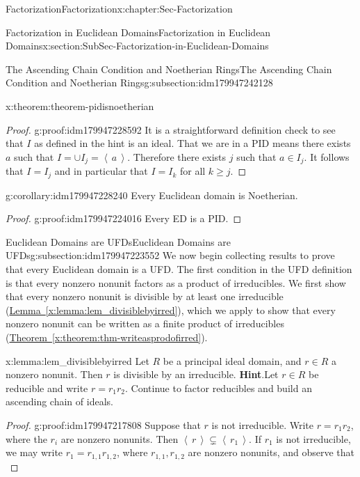 \documentclass[oneside,10pt,]{book}
\newcommand{\blocktitlefont}{\relax}
\newcommand{\xreffont}{\relax}
\numberwithin{equation}{section}
\renewcommand{\geq}{\geqslant}
\newcommand{\ideal}[1]{\left\langle\, #1 \,\right\rangle}
\begin{document}
\begin{chapterptx}{Factorization}{}{Factorization}{}{}{x:chapter:Sec-Factorization}
\begin{sectionptx}{Factorization in Euclidean Domains}{}{Factorization in Euclidean Domains}{}{}{x:section:SubSec-Factorization-in-Euclidean-Domains}
\begin{subsectionptx}{The Ascending Chain Condition and Noetherian Rings}{}{The Ascending Chain Condition and Noetherian Rings}{}{}{g:subsection:idm179947242128}
\begin{theorem}{}{}{x:theorem:theorem-pidisnoetherian}
\end{theorem}
\begin{proof}{}{g:proof:idm179947228592}
It is a straightforward definition check to see that \(I\) as defined in the hint is an ideal. That we are in a PID means there exists \(a\) such that \(I=\cup I_j=\ideal{a}\). Therefore there exists \(j\) such that \(a\in I_j\). It follows that \(I=I_j\) and in particular that \(I=I_k\) for all \(k\geq j\).%
\end{proof}
\begin{corollary}{}{}{g:corollary:idm179947228240}%
Every Euclidean domain is Noetherian.%
\end{corollary}
\begin{proof}{}{g:proof:idm179947224016}
Every ED is a PID.%
\end{proof}
\end{subsectionptx}
%
%
\typeout{************************************************}
\typeout{************************************************}
%
\begin{subsectionptx}{Euclidean Domains are UFDs}{}{Euclidean Domains are UFDs}{}{}{g:subsection:idm179947223552}
We now begin collecting results to prove that every Euclidean domain is a UFD. The first condition in the UFD definition is that every nonzero nonunit factors as a product of irreducibles. We first show that every nonzero nonunit is divisible by at least one irreducible (\hyperref[x:lemma:lem_divisiblebyirred]{Lemma~{\xreffont\ref{x:lemma:lem_divisiblebyirred}}}), which we apply to show that every nonzero nonunit can be written as a finite product of irreducibles (\hyperref[x:theorem:thm-writeasprodofirred]{Theorem~{\xreffont\ref{x:theorem:thm-writeasprodofirred}}}).%
\begin{lemma}{}{}{x:lemma:lem_divisiblebyirred}%
Let \(R\) be a principal ideal domain, and \(r\in R\) a nonzero nonunit. Then \(r\) is divisible by an irreducible.%
\textbf{\blocktitlefont Hint}.\quad{}Let \(r\in R\) be reducible and write \(r = r_1 r_2\). Continue to factor reducibles and build an ascending chain of ideals.%
\end{lemma}
\begin{proof}{}{g:proof:idm179947217808}
Suppose that \(r\) is not irreducible. Write \(r = r_1 r_2\), where the \(r_i\) are nonzero nonunits. Then \(\ideal{r} \subsetneq \ideal{r_1}\). If \(r_1\) is not irreducible, we may write \(r_1 = r_{1,1}r_{1,2}\), where \(r_{1,1},r_{1,2}\) are nonzero nonunits, and observe that%
\begin{equation*}

\end{equation*}
\end{proof}
\end{subsectionptx}
\end{sectionptx}
\end{chapterptx}
\end{document}
